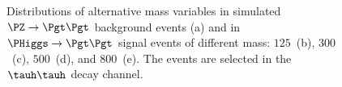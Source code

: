 \begin{figure}
\begin{center}
\end{center}
\caption{
  Distributions of alternative mass variables in simulated $\PZ \to \Pgt\Pgt$ background events (a) 
  and in $\PHiggs \to \Pgt\Pgt$ signal events of different mass:
  $125$~\GeV (b), $300$~\GeV (c), $500$~\GeV (d), and $800$~\GeV (e).
  The events are selected in the $\tauh\tauh$ decay channel.
}
\label{fig:massDistributions_mssm_tautau}
\end{figure}

